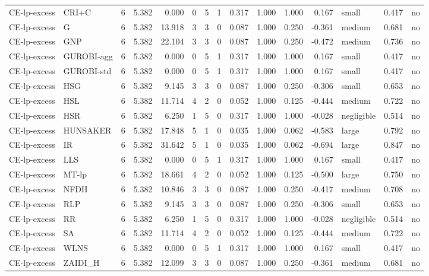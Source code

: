 \begin{table}[htbp]
\begin{tabular}{llrrrrrrrrrrlrr}
CE-lp-excess & CRI+C & 6 & 5.382 & 0.000 & 0 & 5 & 1 & 0.317 & 1.000 & 1.000 & 0.167 & small & 0.417 & no \\
CE-lp-excess & G & 6 & 5.382 & 13.918 & 3 & 3 & 0 & 0.087 & 1.000 & 0.250 & -0.361 & medium & 0.681 & no \\
CE-lp-excess & GNP & 6 & 5.382 & 22.104 & 3 & 3 & 0 & 0.087 & 1.000 & 0.250 & -0.472 & medium & 0.736 & no \\
CE-lp-excess & GUROBI-agg & 6 & 5.382 & 0.000 & 0 & 5 & 1 & 0.317 & 1.000 & 1.000 & 0.167 & small & 0.417 & no \\
CE-lp-excess & GUROBI-std & 6 & 5.382 & 0.000 & 0 & 5 & 1 & 0.317 & 1.000 & 1.000 & 0.167 & small & 0.417 & no \\
CE-lp-excess & HSG & 6 & 5.382 & 9.145 & 3 & 3 & 0 & 0.087 & 1.000 & 0.250 & -0.306 & small & 0.653 & no \\
CE-lp-excess & HSL & 6 & 5.382 & 11.714 & 4 & 2 & 0 & 0.052 & 1.000 & 0.125 & -0.444 & medium & 0.722 & no \\
CE-lp-excess & HSR & 6 & 5.382 & 6.250 & 1 & 5 & 0 & 0.317 & 1.000 & 1.000 & -0.028 & negligible & 0.514 & no \\
CE-lp-excess & HUNSAKER & 6 & 5.382 & 17.848 & 5 & 1 & 0 & 0.035 & 1.000 & 0.062 & -0.583 & large & 0.792 & no \\
CE-lp-excess & IR & 6 & 5.382 & 31.642 & 5 & 1 & 0 & 0.035 & 1.000 & 0.062 & -0.694 & large & 0.847 & no \\
CE-lp-excess & LLS & 6 & 5.382 & 0.000 & 0 & 5 & 1 & 0.317 & 1.000 & 1.000 & 0.167 & small & 0.417 & no \\
CE-lp-excess & MT-lp & 6 & 5.382 & 18.661 & 4 & 2 & 0 & 0.052 & 1.000 & 0.125 & -0.500 & large & 0.750 & no \\
CE-lp-excess & NFDH & 6 & 5.382 & 10.846 & 3 & 3 & 0 & 0.087 & 1.000 & 0.250 & -0.417 & medium & 0.708 & no \\
CE-lp-excess & RLP & 6 & 5.382 & 9.145 & 3 & 3 & 0 & 0.087 & 1.000 & 0.250 & -0.306 & small & 0.653 & no \\
CE-lp-excess & RR & 6 & 5.382 & 6.250 & 1 & 5 & 0 & 0.317 & 1.000 & 1.000 & -0.028 & negligible & 0.514 & no \\
CE-lp-excess & SA & 6 & 5.382 & 11.714 & 4 & 2 & 0 & 0.052 & 1.000 & 0.125 & -0.444 & medium & 0.722 & no \\
CE-lp-excess & WLNS & 6 & 5.382 & 0.000 & 0 & 5 & 1 & 0.317 & 1.000 & 1.000 & 0.167 & small & 0.417 & no \\
CE-lp-excess & ZAIDI\_H & 6 & 5.382 & 12.099 & 3 & 3 & 0 & 0.087 & 1.000 & 0.250 & -0.361 & medium & 0.681 & no \\

\end{tabular}
\end{table}
